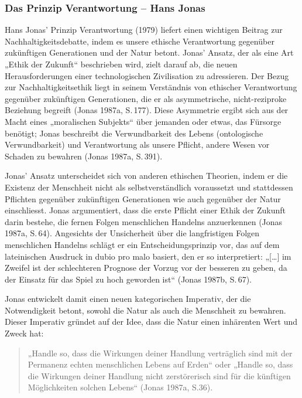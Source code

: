 \documentclass[
  letterpaper,
  DIV=11,
  numbers=noendperiod]{scrartcl}
\begin{document}
\subsubsection{Das Prinzip Verantwortung -- Hans
Jonas}\label{das-prinzip-verantwortung-hans-jonas}

Hans Jonas' Prinzip Verantwortung (1979) liefert einen wichtigen Beitrag
zur Nachhaltigkeitsdebatte, indem es unsere ethische Verantwortung
gegenüber zukünftigen Generationen und der Natur betont. Jonas' Ansatz,
der als eine Art „Ethik der Zukunft`` beschrieben wird, zielt darauf ab,
die neuen Herausforderungen einer technologischen Zivilisation zu
adressieren. Der Bezug zur Nachhaltigkeitsethik liegt in seinem
Verständnis von ethischer Verantwortung gegenüber zukünftigen
Generationen, die er als asymmetrische, nicht-reziproke Beziehung
begreift (Jonas 1987a, S.\,177). Diese Asymmetrie ergibt sich aus der
Macht eines „moralischen Subjekts`` über jemanden oder etwas, das
Fürsorge benötigt; Jonas beschreibt die Verwundbarkeit des Lebens
(ontologische Verwundbarkeit) und Verantwortung als unsere Pflicht,
andere Wesen vor Schaden zu bewahren (Jonas 1987a, S.\,391).

Jonas' Ansatz unterscheidet sich von anderen ethischen Theorien, indem
er die Existenz der Menschheit nicht als selbstverständlich voraussetzt
und stattdessen Pflichten gegenüber zukünftigen Generationen wie auch
gegenüber der Natur einschliesst. Jonas argumentiert, dass die erste
Pflicht einer Ethik der Zukunft darin bestehe, die fernen Folgen
menschlichen Handelns anzuerkennen (Jonas 1987a, S.\,64). Angesichts der
Unsicherheit über die langfristigen Folgen menschlichen Handelns schlägt
er ein Entscheidungsprinzip vor, das auf dem lateinischen Ausdruck in
dubio pro malo basiert, den er so interpretiert: „{[}\ldots{]} im
Zweifel ist der schlechteren Prognose der Vorzug vor der besseren zu
geben, da der Einsatz für das Spiel zu hoch geworden ist`` (Jonas 1987b,
S.\,67).

Jonas entwickelt damit einen neuen kategorischen Imperativ, der die
Notwendigkeit betont, sowohl die Natur als auch die Menschheit zu
bewahren. Dieser Imperativ gründet auf der Idee, dass die Natur einen
inhärenten Wert und Zweck hat:

\begin{quote}
„Handle so, dass die Wirkungen deiner Handlung verträglich sind mit der
Permanenz echten menschlichen Lebens auf Erden`` oder „Handle so, dass
die Wirkungen deiner Handlung nicht zerstörerisch sind für die künftigen
Möglichkeiten solchen Lebens`` (Jonas 1987a, S.36).
\end{quote}
\end{document}
